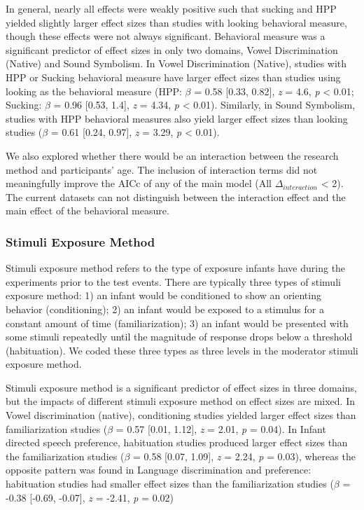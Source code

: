 \documentclass[10pt, letterpaper]{article}
\begin{document}
In general, nearly all effects were weakly positive such that sucking
and HPP yielded slightly larger effect sizes than studies with looking
behavioral measure, though these effects were not always significant.
Behavioral measure was a significant predictor of effect sizes in only
two domains, Vowel Discrimination (Native) and Sound Symbolism. In Vowel
Discrimination (Native), studies with HPP or Sucking behavioral measure
have larger effect sizes than studies using looking as the behavioral
measure (HPP: \(\beta\) = 0.58 {[}0.33, 0.82{]}, \emph{z} = 4.6,
\emph{p} \textless{} 0.01; Sucking: \(\beta\) = 0.96 {[}0.53, 1.4{]},
\emph{z} = 4.34, \emph{p} \textless{} 0.01). Similarly, in Sound
Symbolism, studies with HPP behavioral measures also yield larger effect
sizes than looking studies (\(\beta\) = 0.61 {[}0.24, 0.97{]}, \emph{z}
= 3.29, \emph{p} \textless{} 0.01).

We also explored whether there would be an interaction between the
research method and participants' age. The inclusion of interaction
terms did not meaningfully improve the AICc of any of the main model
(All \(\Delta_{interaction}\) \textless{} 2). The current datasets can
not distinguish between the interaction effect and the main effect of
the behavioral measure.

\hypertarget{stimuli-exposure-method}{%
\subsubsection{Stimuli Exposure Method}\label{stimuli-exposure-method}}

Stimuli exposure method refers to the type of exposure infants have
during the experiments prior to the test events. There are typically
three types of stimuli exposure method: 1) an infant would be
conditioned to show an orienting behavior (conditioning); 2) an infant
would be exposed to a stimulus for a constant amount of time
(familiarization); 3) an infant would be presented with some stimuli
repeatedly until the magnitude of response drops below a threshold
(habituation). We coded these three types as three levels in the
moderator stimuli exposure method.

Stimuli exposure method is a significant predictor of effect sizes in
three domains, but the impacts of different stimuli exposure method on
effect sizes are mixed. In Vowel discrimination (native), conditioning
studies yielded larger effect sizes than familiarization studies
(\(\beta\) = 0.57 {[}0.01, 1.12{]}, \emph{z} = 2.01, \emph{p} = 0.04).
In Infant directed speech preference, habituation studies produced
larger effect sizes than the familiarization studies (\(\beta\) = 0.58
{[}0.07, 1.09{]}, \emph{z} = 2.24, \emph{p} = 0.03), whereas the
opposite pattern was found in Language discrimination and preference:
habituation studies had smaller effect sizes than the familiarization
studies (\(\beta\) = -0.38 {[}-0.69, -0.07{]}, \emph{z} = -2.41,
\emph{p} = 0.02)
\end{document}
